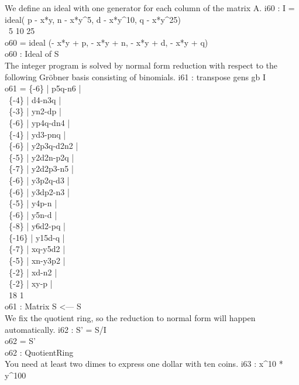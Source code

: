 We define an ideal with one generator for each column of the matrix A.
\beginOutput
i60 : I = ideal( p - x*y, n - x*y^5, d - x*y^10, q - x*y^25)\\
\emptyLine
\                             5           10           25\\
o60 = ideal (- x*y + p, - x*y  + n, - x*y   + d, - x*y   + q)\\
\emptyLine
o60 : Ideal of S\\
\endOutput
The integer program is solved by normal form reduction with respect
to the following Gr\"obner basis consisting of binomials.
\beginOutput
i61 : transpose gens gb I\\
\emptyLine
o61 = \{-6\}  | p5q-n6     |\\
\      \{-4\}  | d4-n3q     |\\
\      \{-3\}  | yn2-dp     |\\
\      \{-6\}  | yp4q-dn4   |\\
\      \{-4\}  | yd3-pnq    |\\
\      \{-6\}  | y2p3q-d2n2 |\\
\      \{-5\}  | y2d2n-p2q  |\\
\      \{-7\}  | y2d2p3-n5  |\\
\      \{-6\}  | y3p2q-d3   |\\
\      \{-6\}  | y3dp2-n3   |\\
\      \{-5\}  | y4p-n      |\\
\      \{-6\}  | y5n-d      |\\
\      \{-8\}  | y6d2-pq    |\\
\      \{-16\} | y15d-q     |\\
\      \{-7\}  | xq-y5d2    |\\
\      \{-5\}  | xn-y3p2    |\\
\      \{-2\}  | xd-n2      |\\
\      \{-2\}  | xy-p       |\\
\emptyLine
\              18       1\\
o61 : Matrix S   <--- S\\
\endOutput
We fix the quotient ring, so the reduction to normal form
will happen automatically.
\beginOutput
i62 : S' = S/I\\
\emptyLine
o62 = S'\\
\emptyLine
o62 : QuotientRing\\
\endOutput
You need at least two dimes to express one dollar with ten coins.
\beginOutput
i63 : x^10 * y^100\\
\emptyLine

